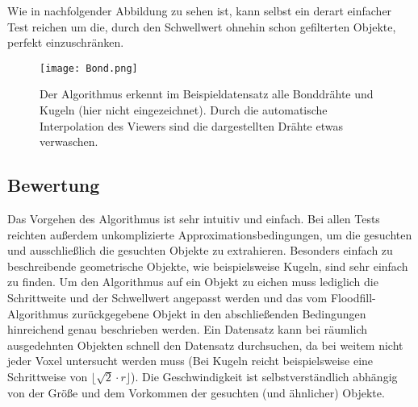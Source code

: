Wie in nachfolgender Abbildung zu sehen ist, kann selbst ein derart einfacher Test reichen um die, durch den Schwellwert ohnehin schon gefilterten Objekte, perfekt einzuschränken.

\begin{figure}[H]
  \begin{center}
    \texttt{[image: Bond.png]}
    \caption{Der Algorithmus erkennt im Beispieldatensatz alle Bonddrähte und Kugeln (hier nicht eingezeichnet). Durch die automatische Interpolation des Viewers sind die dargestellten Drähte etwas verwaschen.}
    \label{fig:Bond}
  \end{center}
\end{figure} 

\subsection{Bewertung}
Das Vorgehen des Algorithmus ist sehr intuitiv und einfach. Bei allen Tests reichten außerdem unkomplizierte Approximationsbedingungen, um die gesuchten und ausschließlich die gesuchten Objekte zu extrahieren.
Besonders einfach zu beschreibende geometrische Objekte, wie beispielsweise Kugeln, sind sehr einfach zu finden. \newline 
Um den Algorithmus auf ein Objekt zu eichen muss lediglich die Schrittweite und der Schwellwert angepasst werden und das vom Floodfill-Algorithmus zurückgegebene Objekt in den abschließenden Bedingungen hinreichend genau beschrieben werden. \newline
Ein Datensatz kann bei räumlich ausgedehnten Objekten schnell den Datensatz durchsuchen, da bei weitem nicht jeder Voxel untersucht werden muss (Bei Kugeln reicht beispielsweise eine Schrittweise von $\lfloor \sqrt{2} \cdot r \rfloor$). Die Geschwindigkeit ist selbstverständlich abhängig von der Größe und dem Vorkommen der gesuchten (und ähnlicher) Objekte.

